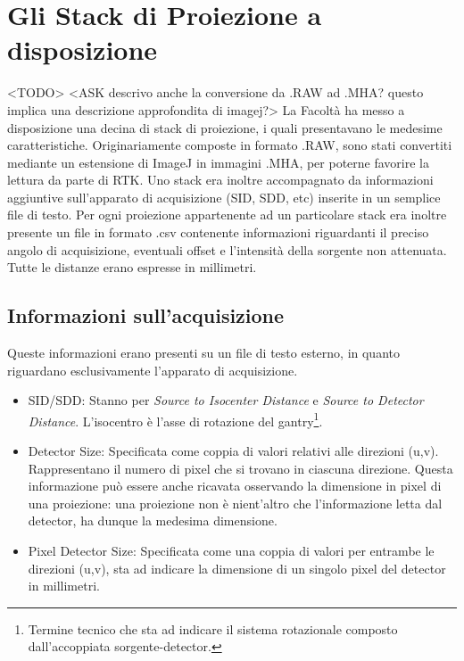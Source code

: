 \documentclass[a4paper,12pt, doubleside]{report}
\begin{document}
        \section{Gli Stack di Proiezione a disposizione}
            <TODO>
            <ASK descrivo anche la conversione da .RAW ad .MHA? questo implica una descrizione approfondita di imagej?>
            La Facoltà ha messo a disposizione una decina di stack di proiezione, i quali presentavano le medesime caratteristiche. Originariamente composte in formato .RAW, sono stati convertiti mediante un estensione di ImageJ in immagini .MHA, per poterne favorire la lettura da parte di RTK. Uno stack era inoltre accompagnato da informazioni aggiuntive sull'apparato di acquisizione (SID, SDD, etc) inserite in un semplice file di testo. Per ogni proiezione appartenente ad un particolare stack era inoltre presente un file in formato .csv contenente informazioni riguardanti il preciso angolo di acquisizione, eventuali offset e l'intensità della sorgente non attenuata.
            Tutte le distanze erano espresse in millimetri.
            
            \subsection{Informazioni sull'acquisizione}
                \label{sub:acq_file}
                \par
                    Queste informazioni erano presenti su un file di testo esterno, in quanto riguardano esclusivamente l'apparato di acquisizione. 
                    
                    \begin{itemize}
                        \item SID/SDD: Stanno per \textit{Source to Isocenter Distance} e \textit{Source to Detector Distance}. L'isocentro è l'asse di rotazione del gantry\footnote{Termine tecnico che sta ad indicare il sistema rotazionale composto dall'accoppiata sorgente-detector.}.
                        \item Detector Size: Specificata come coppia di valori relativi alle direzioni (u,v). Rappresentano il numero di pixel che si trovano in ciascuna direzione. Questa informazione può essere anche ricavata osservando la dimensione in pixel di una proiezione: una proiezione non è nient'altro che l'informazione letta dal detector, ha dunque la medesima dimensione.
                        \item Pixel Detector Size: Specificata come una coppia di valori per entrambe le direzioni (u,v), sta ad indicare la dimensione di un singolo pixel del detector in millimetri.
                    \end{itemize}
                    
\end{document}
